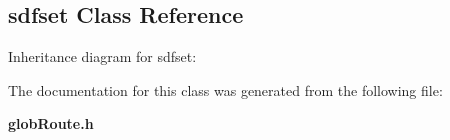 \subsection{sdfset  Class Reference}
\label{sdfset}
Inheritance diagram for sdfset:\begin{figure}[H]
\begin{center}
\leavevmode
\setlength{\epsfysize}{2cm}
\end{center}
\end{figure}


The documentation for this class was generated from the following file:\begin{CompactItemize}
\item 
{\bf glob\-Route.h}\end{CompactItemize}
